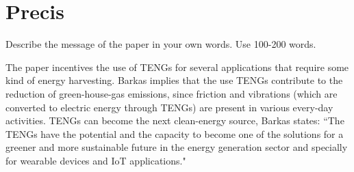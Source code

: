 \documentclass{article}
\begin{document}
\clearpage
\section{Precis}
Describe the message of the paper in your own words. Use 100-200
words.
\begin{mdframed}
The paper incentives the use of TENGs for several applications that require some kind of energy harvesting. Barkas implies that the use TENGs contribute to the reduction of green-house-gas emissions, since friction and vibrations (which are converted to electric energy through TENGs) are present in various every-day activities. TENGs can become the next clean-energy source, Barkas states: ``The TENGs have the potential and the capacity to become one of the solutions for a greener and more sustainable future in the energy generation sector and specially for wearable devices and IoT applications."
\end{mdframed}

\clearpage
\printbibliography


\end{document}

